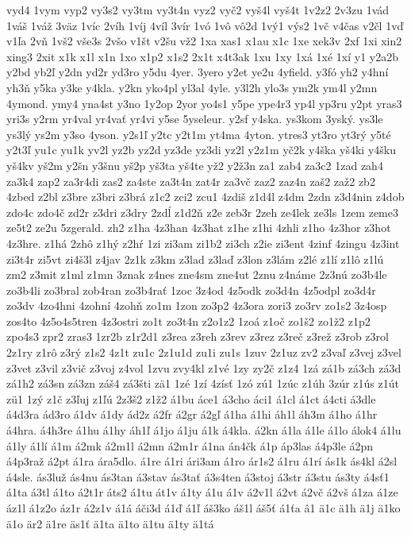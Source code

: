 {vyd4
1vym
vyp2
vy3s2
vy3tm
vy3t4n
vyz2
vyč2
vyš4l
vyš4t
1v2z2
2v3zu
1vád
1váš
1váž
3väz
1víc
2víh
1víj
4víl
3vír
1vó
1vô
vô2d
1vý1
výs2
1vč
v4čas
v2čl
1vď
v1ľa
2vň
1vš2
vše3s
2všo
v1št
v2šu
vž2
1xa
xas1
x1au
x1c
1xe
xek3v
2xf
1xi
xin2
xing3
2xit
x1k
x1l
x1n
1xo
x1p2
x1s2
2x1t
x4t3ak
1xu
1xy
1xá
1xé
1xí
y1
y2a2b
y2bd
yb2ľ
y2dn
yd2r
yd3ro
y5du
4yer.
3yero
y2et
ye2u
4yfield.
y3fó
yh2
y4hní
yh3ň
y5ka
y3ke
y4kla.
y2kn
yko4pl
yl3al
4yle.
y3l2h
ylo3s
ym2k
ym4l
y2mn
4ymond.
ymy4
yna4st
y3no
1y2op
2yor
yo4s1
y5pe
ype4r3
yp4l
yp3ru
y2pt
yras3
yri3s
y2rm
yr4val
yr4vať
yr4vi
y5se
5yseleur.
y2sf
y4ska.
ys3kom
3yský.
ys3le
ys3lý
ys2m
y3so
4yson.
y2s1ľ
y2tc
y2t1m
yt4ma
4yton.
ytres3
yt3ro
yt3rý
y5té
y2t3ľ
yu1c
yu1k
yv2l
yz2b
yz2d
yz3de
yz3di
yz2l
y2z1m
yč2k
y4ška
yš4ki
y4šku
yš4kv
yš2m
y2šn
y3šnu
yš2p
yš3ta
yš4te
yž2
y2ž3n
za1
zab4
za3c2
1zad
zah4
za3k4
zap2
za3r4di
zas2
za4ste
za3t4n
zat4r
za3vč
zaz2
zaz4n
zaš2
zaž2
zb2
4zbed
z2bl
z3bre
z3bri
z3brá
z1c2
zci2
zcu1
4zdiš
z1d4l
z4dm
2zdn
z3d4nin
z4dob
zdo4c
zdo4č
zd2r
z3dri
z3dry
2zdĺ
z1d2ň
z2e
zeb3r
2zeh
ze4lek
ze3ls
1zem
zeme3
ze5t2
ze2u
5zgerald.
zh2
z1ha
4z3han
4z3hat
z1he
z1hi
4zhli
z1ho
4z3hor
z3hot
4z3hre.
z1há
2zhô
z1hý
z2hŕ
1zi
zi3am
zi1b2
zi3ch
z2ie
zi3ent
4zinf
4zingu
4z3int
zi3t4r
zi5vt
zi4š3l
z4jav
2z1k
z3km
z3lad
z3laď
z3lon
z3lám
z2lé
z1lí
z1lô
z1lú
zm2
z3mit
z1ml
z1mn
3znak
z4nes
zne4sm
zne4ut
2znu
z4náme
2z3nú
zo3b4le
zo3b4li
zo3bral
zob4ran
zo3b4rať
1zoc
3z4od
4z5odk
zo3d4n
4z5odpl
zo3d4r
zo3dv
4zo4hni
4zohní
4zohň
zo1m
1zon
zo3p2
4z3ora
zori3
zo3rv
zo1s2
3z4osp
zos4to
4z5o4s5tren
4z3ostri
zo1t
zo3t4n
z2o1z2
1zoá
z1oč
zo1š2
zo1ž2
z1p2
zpo4s3
zpr2
zras3
1zr2b
z1r2d1
z3rea
z3reh
z3rev
z3rez
z3reč
z3rež
z3rob
z3rol
2z1ry
z1rô
z3rý
z1s2
4z1t
zu1c
2z1u1d
zu1i
zu1s
1zuv
2z1uz
zv2
z3vaľ
z3vej
z3vel
z3vet
z3vil
z3vič
z3voj
z4vol
1zvu
zvy4kl
z1vé
1zy
zy2č
z1z4
1zá
zá1b
zá3ch
zá3d
zá1h2
zá3sn
zá3zn
záš4
zá3šti
zä1
1zé
1zí
4zísť
1zó
zú1
1zúc
z1úh
3zúr
z1ús
z1út
zü1
1zý
z1č
z3ľuj
z1ľú
2z3š2
z1ž2
á1bu
áce1
á3cho
áci1
á1cl
á1ct
á4cti
á3dle
á4d3ra
ád3ro
á1dv
á1dy
ád2z
á2fr
á2gr
á2gľ
á1ha
á1hi
áh1l
áh3m
á1ho
á1hr
á4hra.
á4h3re
á1hu
á1hy
áh1ľ
á1jo
á1ju
á1k
á4kla.
á2kn
á1la
á1le
á1lo
álok4
á1lu
á1ly
á1lí
á1m
á2mk
á2m1l
á2mn
á2m1r
á1na
án4čk
á1p
áp3las
á4p3le
á2pn
á4p3raž
á2pt
á1ra
ára5dlo.
á1re
á1ri
ári3am
á1ro
ár1s2
á1ru
á1rí
ás1k
ás4kl
á2sl
á4sle.
ás3luž
ás4nu
ás3tan
á3stav
ás3tať
á3s4ten
á3stoj
á3str
á3stu
ás3ty
á4sť1
á1ta
á3tl
á1to
á2t1r
áts2
á1tu
át1v
á1ty
á1u
á1v
á2v1l
á2vt
á2vč
á2vš
á1za
á1ze
áz1l
á1z2o
áz1r
á2z1v
á1á
áči3d
á1ď
á1ľ
áš3ko
áš1l
áš5ť
á1ťa
â1
ä1c
ä1h
ä1j
ä1ko
ä1o
är2
ä1re
äs1ť
ä1ta
ä1to
ä1tu
ä1ty
ä1tá
}
